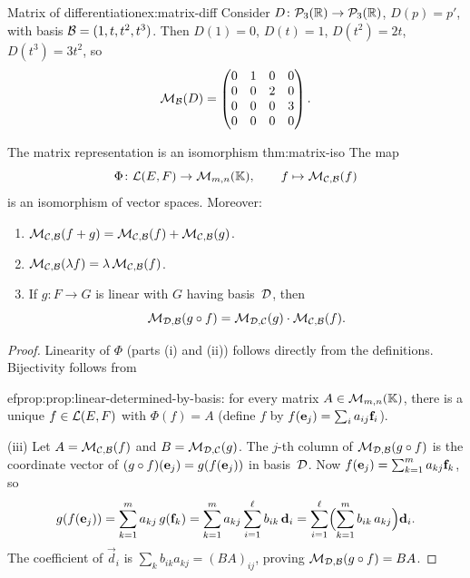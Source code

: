 \begin{example}{Matrix of differentiation}{ex:matrix-diff}
Consider $D\colon{\mathcal{P}}_3({\mathbb{R}})\to{\mathcal{P}}_3({\mathbb{R}})$, $D(p) = p'$, with basis
${\mathcal{B}} = (1,t,t^2,t^3)$. Then $D(1)=0$, $D(t)=1$, $D(t^2)=2t$,
$D(t^3)=3t^2$, so
\[
  \mathcal{M}_{\mathcal{B}}(D) = \begin{pmatrix}
    0 & 1 & 0 & 0\\
    0 & 0 & 2 & 0\\
    0 & 0 & 0 & 3\\
    0 & 0 & 0 & 0
  \end{pmatrix}.
\]
\end{example}

\begin{theorem}{The matrix representation is an isomorphism}%
{thm:matrix-iso}
The map
\[
  \Phi\colon {\mathcal{L}}(E,F) \to \mathcal{M}_{m,n}({\mathbb{K}}), \qquad
  f \mapsto \mathcal{M}_{{\mathcal{C}},{\mathcal{B}}}(f)
\]
is an isomorphism of vector spaces. Moreover:
\begin{enumerate}[label=(\roman*)]
  \item $\mathcal{M}_{{\mathcal{C}},{\mathcal{B}}}(f+g) = \mathcal{M}_{{\mathcal{C}},{\mathcal{B}}}(f) + \mathcal{M}_{{\mathcal{C}},{\mathcal{B}}}(g)$.
  \item $\mathcal{M}_{{\mathcal{C}},{\mathcal{B}}}(\lambda f) = \lambda\,\mathcal{M}_{{\mathcal{C}},{\mathcal{B}}}(f)$.
  \item If $g\colon F\to G$ is linear with $G$ having basis~${\mathcal{D}}$, then
    \[
      \mathcal{M}_{{\mathcal{D}},{\mathcal{B}}}(g\circ f)
      = \mathcal{M}_{{\mathcal{D}},{\mathcal{C}}}(g)\cdot\mathcal{M}_{{\mathcal{C}},{\mathcal{B}}}(f).
    \]
\end{enumerate}
\end{theorem}

\begin{proof}
Linearity of $\Phi$ (parts (i) and (ii)) follows directly from the
definitions. Bijectivity follows from

ef{prop:prop:linear-determined-by-basis}: for every matrix
$A\in\mathcal{M}_{m,n}({\mathbb{K}})$, there is a unique $f\in{\mathcal{L}}(E,F)$ with
$\Phi(f) = A$ (define $f$ by $f(\mathbf{e}_{j}) = \sum_i a_{ij}\mathbf{f}_{i}$).

(iii) Let $A = \mathcal{M}_{{\mathcal{C}},{\mathcal{B}}}(f)$ and $B = \mathcal{M}_{{\mathcal{D}},{\mathcal{C}}}(g)$.
The $j$-th column of $\mathcal{M}_{{\mathcal{D}},{\mathcal{B}}}(g\circ f)$ is the coordinate
vector of $(g\circ f)(\mathbf{e}_{j}) = g(f(\mathbf{e}_{j}))$ in basis~${\mathcal{D}}$.
Now $f(\mathbf{e}_{j}) = \sum_{k=1}^m a_{kj}\mathbf{f}_{k}$, so
\[
  g(f(\mathbf{e}_{j})) = \sum_{k=1}^m a_{kj}\,g(\mathbf{f}_{k})
  = \sum_{k=1}^m a_{kj}\sum_{i=1}^\ell b_{ik}\,\mathbf{d}_i
  = \sum_{i=1}^\ell\Bigl(\sum_{k=1}^m b_{ik}\,a_{kj}\Bigr)\mathbf{d}_i.
\]
The coefficient of $\vec{d}_i$ is $\sum_k b_{ik}a_{kj} = (BA)_{ij}$,
proving $\mathcal{M}_{{\mathcal{D}},{\mathcal{B}}}(g\circ f) = BA$.
\end{proof}

